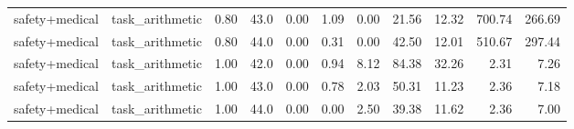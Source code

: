 \begin{table}[H]
{\begin{tabular}{llllrrrrrrr}
safety+medical & task\_arithmetic & 0.80 & 43.0 & 0.00 & 1.09 & 0.00 & 21.56 & 12.32 & 700.74 & 266.69 \\
safety+medical & task\_arithmetic & 0.80 & 44.0 & 0.00 & 0.31 & 0.00 & 42.50 & 12.01 & 510.67 & 297.44 \\
safety+medical & task\_arithmetic & 1.00 & 42.0 & 0.00 & 0.94 & 8.12 & 84.38 & 32.26 & 2.31 & 7.26 \\
safety+medical & task\_arithmetic & 1.00 & 43.0 & 0.00 & 0.78 & 2.03 & 50.31 & 11.23 & 2.36 & 7.18 \\
safety+medical & task\_arithmetic & 1.00 & 44.0 & 0.00 & 0.00 & 2.50 & 39.38 & 11.62 & 2.36 & 7.00 \\
\bottomrule
\end{tabular}
}
\end{table}